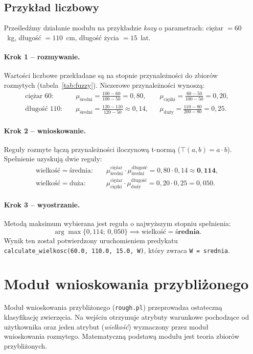 \documentclass[11pt,a4paper]{article}
\newcommand{\code}[1]{\texttt{#1}}
\begin{document}
\subsection{Przykład liczbowy}
Prześledźmy działanie modułu na przykładzie \textit{kozy} o parametrach:
ciężar $= 60$~kg, długość $= 110$~cm, długość życia $= 15$~lat.

\paragraph{Krok 1 -- rozmywanie.}
Wartości liczbowe przekładane są na stopnie przynależności do zbiorów rozmytych
(tabela~\ref{tab:fuzzy}). Niezerowe przynależności wynoszą:
\begin{align*}
\text{ciężar }60: \quad
  &\mu_{\text{średni}} = \tfrac{100-60}{100-50} = 0{,}80, &
  &\mu_{\text{ciężki}} = \tfrac{60-50}{100-50} = 0{,}20, \\
\text{długość }110: \quad
  &\mu_{\text{średni}} = \tfrac{120-110}{120-50} \approx 0{,}14, &
  &\mu_{\text{duży}} = \tfrac{110-80}{200-80} = 0{,}25.
\end{align*}

\paragraph{Krok 2 -- wnioskowanie.}
Reguły rozmyte łączą przynależności iloczynową t-normą
($\top(a,b)=a\cdot b$). Spełnienie uzyskują dwie reguły:
\begin{align*}
\text{wielkość} = \text{średnia}:\quad & \mu_{\text{średni}}^{\text{ciężar}} \cdot \mu_{\text{średni}}^{\text{długość}} = 0{,}80 \cdot 0{,}14 \approx \mathbf{0{,}114}, \\
\text{wielkość} = \text{duża}:\quad & \mu_{\text{ciężki}}^{\text{ciężar}} \cdot \mu_{\text{duży}}^{\text{długość}} = 0{,}20 \cdot 0{,}25 = 0{,}050.
\end{align*}

\paragraph{Krok 3 -- wyostrzanie.}
Metodą maksimum wybierana jest reguła o najwyższym stopniu spełnienia:
\[
\arg\max\{0{,}114;\ 0{,}050\} \implies \text{wielkość} = \textbf{średnia}.
\]
Wynik ten został potwierdzony uruchomieniem predykatu
\code{calculate\_wielkosc(60.0, 110.0, 15.0, W)}, który zwraca
\code{W = srednia}.

\section{Moduł wnioskowania przybliżonego}
\label{sec:rough}
Moduł wnioskowania przybliżonego (\code{rough.pl}) przeprowadza ostateczną
klasyfikację zwierzęcia. Na wejściu otrzymuje atrybuty warunkowe pochodzące od
użytkownika oraz jeden atrybut (\textit{wielkość}) wyznaczony przez moduł
wnioskowania rozmytego. Matematyczną podstawą modułu jest teoria zbiorów
przybliżonych.
\end{document}
